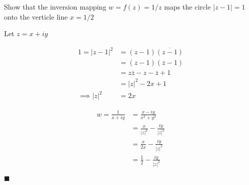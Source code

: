 \documentclass[12pt]{article}
\author{Warren Atkison}
\date{\today}
\renewcommand{\qed}{\hfill$\blacksquare$}
\renewenvironment{proof}{\vspace{1em}\begin{addmargin}[2em]{0em}\begin{newproof}}{\end{newproof}\end{addmargin}\qed}
\newenvironment{exercise}[2][Exercise]{\begin{trivlist}
\item[\hskip \labelsep {\bfseries #1} \hskip \labelsep {\bfseries #2.}]}{\end{trivlist}}
\begin{document}
\fancyhf{}
\fancyhead[R]{\today}
\fancyfoot[R]{\thepage}

\begin{exercise}{4c} 
	Show that the inversion mapping $w = f(z) = 1/z$ maps the circle $|z - 1| = 1$ onto the verticle line $x = 1/2$
\begin{proof} Let $z = x + iy$
	\begin{multicols}{2}	
	\begin{align*}
		1 = |z - 1|^2 &= (z - 1)\overline{(z - 1)} \\
			      &= (z - 1)(\overline{z} - 1) \\
			      &= z\overline{z} -z -\overline{z} + 1 \\
			      &= |z|^2 - 2x + 1 \\
		\implies |z|^2 &= 2x \\
	\end{align*}
	\begin{align*}
		\\
		w = \frac{1}{x + iy}&= \frac{x - iy}{x^2 + y^2} \\
				     &= \frac{x}{|z|^2} - \frac{iy}{|z|^2} \\
								&= \frac{x}{2x} - \frac{iy}{|z|^2} \\
								&= \frac{1}{2} - \frac{iy}{|z|^2}
	\end{align*}
	\end{multicols}
\end{proof}	
\end{exercise}
\end{document}
